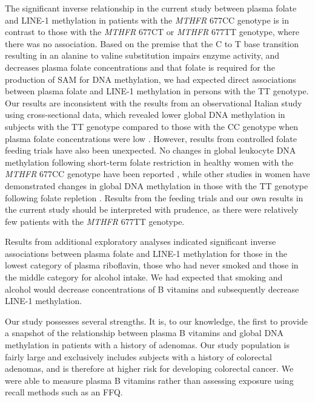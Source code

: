 \noindent The significant inverse relationship in the current study between plasma folate and LINE-1 methylation in patients with the \emph{MTHFR} 677CC genotype is in contrast to those with the \emph{MTHFR} 677CT or \emph{MTHFR} 677TT genotype, where there was no association. Based on the premise that the C to T base transition resulting in an alanine to valine substitution impairs enzyme activity, and decreases plasma folate concentrations \cite{c523,c556} and that folate is required for the production of SAM for DNA methylation, we had expected direct associations between plasma folate and LINE-1 methylation in persons with the TT genotype. Our results are inconsistent with the results from an observational Italian study using cross-sectional data, which revealed lower global DNA methylation in subjects with the TT genotype compared to those with the CC genotype when plasma folate concentrations were low \cite{c557}. However, results from controlled folate feeding trials have also been unexpected. No 
changes in global leukocyte DNA methylation following short-term folate restriction in healthy women with the \emph{MTHFR} 677CC genotype have been reported \cite{c528}, while other studies in women have demonstrated changes in global DNA methylation in those with the TT genotype following folate repletion \cite{c558,c559}. Results from the feeding trials and our own results in the current study should be interpreted with prudence, as there were relatively few patients with the \emph{MTHFR} 677TT genotype.

\noindent Results from additional exploratory analyses indicated significant inverse associations between plasma folate and LINE-1 methylation for those in the lowest category of plasma riboflavin, those who had never smoked and those in the middle category for alcohol intake. We had expected that smoking and alcohol would decrease concentrations of B vitamins and subsequently decrease LINE-1 methylation.

\noindent Our study possesses several strengths. It is, to our knowledge, the first to provide a snapshot of the relationship between plasma B vitamins and global DNA methylation in patients with a history of adenomas. Our study population is fairly large and exclusively includes subjects with a history of colorectal adenomas, and is therefore at higher risk for developing colorectal cancer. We were able to measure plasma B vitamins rather than assessing exposure using recall methods such as an FFQ.

